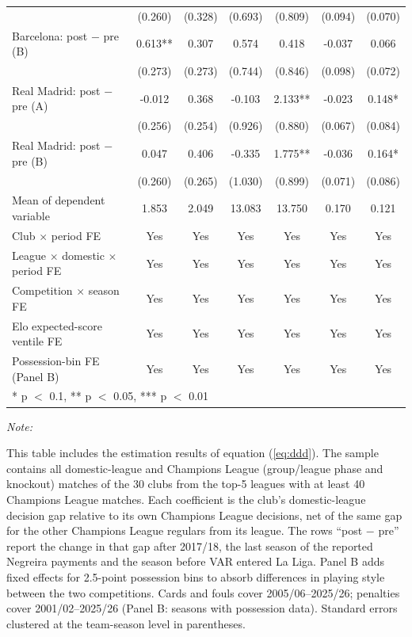 \begin{table}[!h]
{\begin{threeparttable}
\begin{tabular}[t]{lcccccc}
 & (0.260) & (0.328) & (0.693) & (0.809) & (0.094) & (0.070)\\
Barcelona: post $-$ pre (B) & 0.613** & 0.307 & 0.574 & 0.418 & -0.037 & 0.066\\
 & (0.273) & (0.273) & (0.744) & (0.846) & (0.098) & (0.072)\\
Real Madrid: post $-$ pre (A) & -0.012 & 0.368 & -0.103 & 2.133** & -0.023 & 0.148*\\
 & (0.256) & (0.254) & (0.926) & (0.880) & (0.067) & (0.084)\\
Real Madrid: post $-$ pre (B) & 0.047 & 0.406 & -0.335 & 1.775** & -0.036 & 0.164*\\
 & (0.260) & (0.265) & (1.030) & (0.899) & (0.071) & (0.086)\\
Mean of dependent variable & 1.853 & 2.049 & 13.083 & 13.750 & 0.170 & 0.121\\
Club $\times$ period FE & Yes & Yes & Yes & Yes & Yes & Yes\\
League $\times$ domestic $\times$ period FE & Yes & Yes & Yes & Yes & Yes & Yes\\
Competition $\times$ season FE & Yes & Yes & Yes & Yes & Yes & Yes\\
Elo expected-score ventile FE & Yes & Yes & Yes & Yes & Yes & Yes\\
Possession-bin FE (Panel B) & Yes & Yes & Yes & Yes & Yes & Yes\\
\bottomrule
\multicolumn{7}{l}{\rule{0pt}{1em}* p $<$ 0.1, ** p $<$ 0.05, *** p $<$ 0.01}\\
\end{tabular}
\begin{tablenotes}[para]
\item \textit{Note: } 
\item This table includes the estimation results of equation (\ref{eq:ddd}). The sample contains all domestic-league and Champions League (group/league phase and knockout) matches of the 30 clubs from the top-5 leagues with at least 40 Champions League matches. Each coefficient is the club's domestic-league decision gap relative to its own Champions League decisions, net of the same gap for the other Champions League regulars from its league. The rows ``post $-$ pre'' report the change in that gap after 2017/18, the last season of the reported Negreira payments and the season before VAR entered La Liga. Panel B adds fixed effects for 2.5-point possession bins to absorb differences in playing style between the two competitions. Cards and fouls cover 2005/06--2025/26; penalties cover 2001/02--2025/26 (Panel B: seasons with possession data). Standard errors clustered at the team-season level in parentheses.
\end{tablenotes}
\end{threeparttable}}
\end{table}
